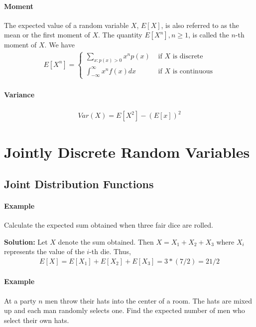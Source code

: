 \documentclass[10 pt,final]{article}
\newcommand{\impo}[1]{{\color{magenta} #1}}
\begin{document}
\paragraph{\impo{Moment}} The expected value of a random variable $X$, $E[X]$, is also referred to as the mean or the first moment of $X$. The quantity $E[X^n], n \geq 1$, is called the \impo{$n$-th moment} of $X$. We have
\begin{align*}
E[X^n] = 
\begin{cases}
\sum_{x:p(x) > 0} x^n p(x) & \mbox{ if $X$ is discrete} \\
\int_{-\infty}^{\infty} x^n f(x) dx & \mbox{ if $X$ is continuous}
\end{cases}
\end{align*}

\paragraph{Variance} 
\begin{align*}
Var(X) = E[X^2] - (E[x])^2
\end{align*}

\section{Jointly Discrete Random Variables}
\subsection{Joint Distribution Functions}
\paragraph{Example} Calculate the expected sum obtained when three fair dice are rolled.

\textbf{Solution:} Let $X$ denote the sum obtained. Then $X = X_1 + X_2 + X_3$ where $X_i$ represents the value of the $i$-th die. Thus,
\begin{align*}
E[X] = E[X_1] + E[X_2] + E[X_3] = 3*(7/2) = 21/2
\end{align*}

\paragraph{Example} At a party $n$ men throw their hats into the center of a room. The hats are mixed up and each man randomly selects one. Find the expected number of men who select their own hats. 
\end{document}
